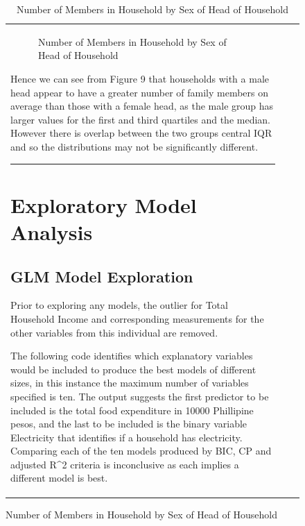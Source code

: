 \documentclass[
]{article}
\begin{document}
\begin{figure}[H]
\begin{table}[H]
\begin{tabular}[t]{lrr}
\begin{figure}[H]
{}

\caption{Number of Members in Household by Sex of Head of Household}\label{fig:boxplot of sex and members}
\end{figure}

Hence we can see from Figure 9 that households with a male head appear
to have a greater number of family members on average than those with a
female head, as the male group has larger values for the first and third
quartiles and the median. However there is overlap between the two
groups central IQR and so the distributions may not be significantly
different.

\begin{center}\rule{0.5\linewidth}{0.5pt}\end{center}

\newpage

\hypertarget{sec:EMA}{%
\section{Exploratory Model Analysis}\label{sec:EMA}}

\hypertarget{glm-model-exploration}{%
\subsection{GLM Model Exploration}\label{glm-model-exploration}}

Prior to exploring any models, the outlier for Total Household Income
and corresponding measurements for the other variables from this
individual are removed.

The following code identifies which explanatory variables would be
included to produce the best models of different sizes, in this instance
the maximum number of variables specified is ten. The output suggests
the first predictor to be included is the total food expenditure in
10000 Phillipine pesos, and the last to be included is the binary
variable Electricity that identifies if a household has electricity.
Comparing each of the ten models produced by BIC, CP and adjusted R\^{}2
criteria is inconclusive as each implies a different model is best.


\end{tabular}
\end{table}
\end{figure}
\end{document}
